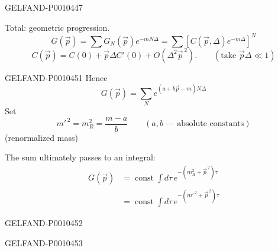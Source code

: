 \begin{GelfandAdjacentEvidence}{GELFAND-P001044}{7}


Total: geometric progression.
\begin{equation*}
G(\vec{p})=\sum G_N(\vec{p})e^{-mN\Delta}
=\sum[C(\vec{p},\Delta)e^{-m\Delta}]^N
\tag{19}
\end{equation*}
\[
C(\vec{p})=C(0)+\vec{p}\Delta C'(0)+O(\Delta^2\vec{p}^{\,2}).
\qquad(\text{take }\vec{p}\Delta\ll1)
\]
\end{GelfandAdjacentEvidence}



\begin{GelfandAdjacentEvidence}{GELFAND-P001045}{1}
Hence
\begin{equation*}
G(\vec{p})=\sum_N e^{(a+b\vec{p}-m)N\Delta}
\tag{20}
\end{equation*}
Set
\[
m'^{\,2}=m_R^2=\frac{m-a}{b}\qquad(a,b\text{ — absolute constants})
\]
(renormalized mass)

The sum ultimately passes to an integral:
\begin{equation*}
\begin{aligned}
G(\vec{p})&=\operatorname{const}\int d\tau\,e^{-(m_R^2+\vec{p}^{\,2})\tau}\\
&=\operatorname{const}\int d\tau\,e^{-(m'^{\,2}+\vec{p}^{\,2})\tau}
\end{aligned}
\tag{21}
\end{equation*}
\end{GelfandAdjacentEvidence}
\begin{GelfandAdjacentEvidence}{GELFAND-P001045}{2}

\end{GelfandAdjacentEvidence}
\begin{GelfandAdjacentEvidence}{GELFAND-P001045}{3}

\end{GelfandAdjacentEvidence}
